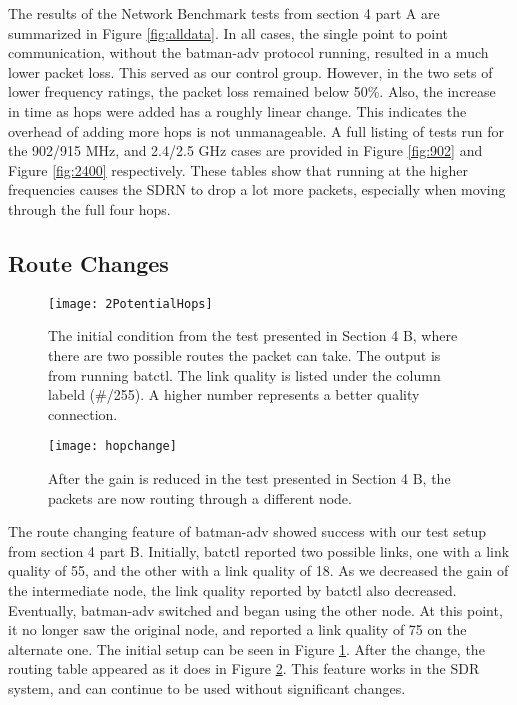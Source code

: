 The results of the Network Benchmark tests from section 4 part A are summarized in Figure \ref{fig:alldata}. In all cases, the single point to point communication, without the batman-adv protocol running, resulted in a much lower packet loss. This served as our control group. However, in the two sets of lower frequency ratings, the packet loss remained below 50\%. Also, the increase in time as hops were added has a roughly linear change. This indicates the overhead of adding more hops is not unmanageable. A full listing of tests run for the 902/915 MHz, and 2.4/2.5 GHz cases are provided in Figure \ref{fig:902} and Figure \ref{fig:2400} respectively. These tables show that running at the higher frequencies causes the SDRN to drop a lot more packets, especially when moving through the full four hops.  


\subsection{Route Changes}

\begin{figure}
	\centering
	\texttt{[image: 2PotentialHops]}
	\caption{The initial condition from the test presented in Section 4 B, where there are two possible routes the packet can take. The output is from running batctl. The link quality is listed under the column labeld (\#/255). A higher number represents a better quality connection.}
	\label{fig:2Hops}
\end{figure}

\begin{figure}
	\centering
	\texttt{[image: hopchange]}
	\caption{After the gain is reduced in the test presented in Section 4 B, the packets are now routing through a different node.}
	\label{fig:NewHop}
\end{figure}

The route changing feature of batman-adv showed success with our test setup from section 4 part B. Initially, batctl reported two possible links, one with a link quality of 55, and the other with a link quality of 18. As we decreased the gain of the intermediate node, the link quality reported by batctl also decreased. Eventually, batman-adv switched and began using the other node. At this point, it no longer saw the original node, and reported a link quality of 75 on the alternate one. The initial setup can be seen in Figure \ref{fig:2Hops}. After the change, the routing table appeared as it does in Figure \ref{fig:NewHop}. This feature works in the SDR system, and can continue to be used without significant changes.  

